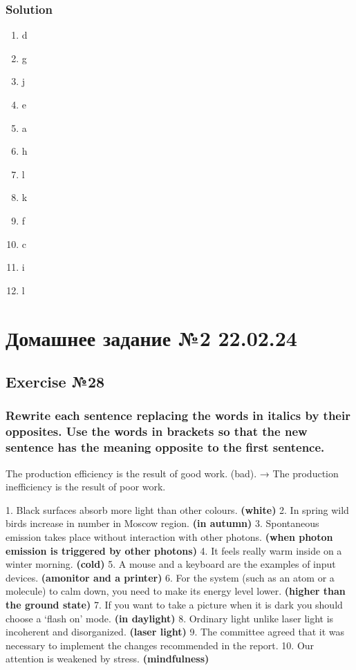 \subsection*{Solution}
\begin{enumerate}
      \item d
      \item g
      \item j
      \item e
      \item a
      \item h
      \item l
      \item k
      \item f
      \item c
      \item i
      \item l
\end{enumerate}

\chapter{Домашнее задание №2 22.02.24}

\section{Exercise №28}
\subsection*{Rewrite each sentence replacing the words in italics by their opposites.
      Use the words in brackets so that the new sentence has the meaning opposite to
      the first sentence.}
The production efficiency is the result of good work. (bad). → The
production inefficiency is the result of poor work.

1. Black surfaces absorb more light than other colours. \textbf{(white)} 2. In spring wild birds
increase in number in Moscow region. \textbf{(in autumn)} 3. Spontaneous emission takes place
without interaction with other photons. \textbf{(when photon emission is triggered by other
photons)} 4. It feels really warm inside on a winter morning. \textbf{(cold)} 5. A mouse and a
keyboard are the examples of input devices. \textbf{(amonitor and a printer)} 6. For the system
(such as an atom or a molecule) to calm down, you need to make its energy level lower.
\textbf{(higher than the ground state)} 7. If you want to take a picture when it is dark you
should choose a ‘flash on’ mode. \textbf{(in daylight)} 8. Ordinary light unlike laser light is
incoherent and disorganized. \textbf{(laser light)} 9. The committee agreed that it was necessary
to implement the changes recommended in the report. 10. Our attention is weakened by
stress. \textbf{(mindfulness)}

